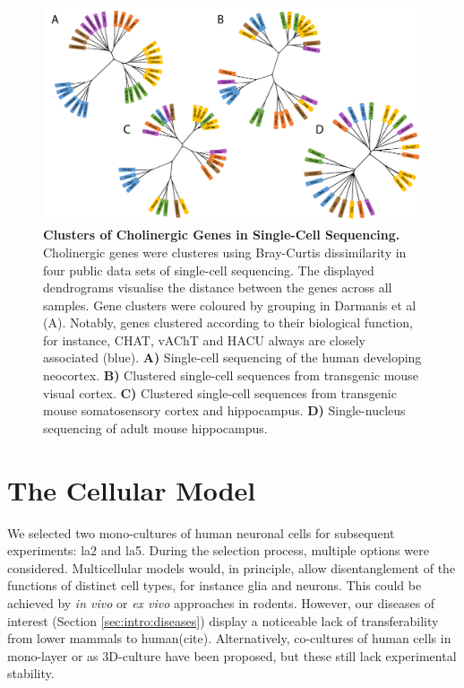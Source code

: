 \begin{figure}
\centering
\includegraphics[width=\textwidth]{figures/chol-clusters}
\caption[Clusters of Cholinergic Genes in Single-Cell Sequencing.]{\textbf{Clusters of Cholinergic Genes in Single-Cell Sequencing.} Cholinergic genes were clusteres using Bray-Curtis dissimilarity in four public data sets of single-cell sequencing. The displayed dendrograms visualise the distance between the genes across all samples. Gene clusters were coloured by grouping in Darmanis et al\cite{Darmanis2015} (A). Notably, genes clustered according to their biological function, for instance, CHAT, vAChT and HACU always are closely associated (blue). \textbf{A)} Single-cell sequencing of the human developing neocortex\cite{Darmanis2015}. \textbf{B)} Clustered single-cell sequences from transgenic mouse visual cortex\cite{Tasic2016}. \textbf{C)} Clustered single-cell sequences from transgenic mouse somatosensory cortex and hippocampus\cite{Zeisel2015}. \textbf{D)} Single-nucleus sequencing of adult mouse hippocampus\cite{Habib2016}. 
\label{fig:chol-clusters}}
\end{figure}

\section{The Cellular Model}
We selected two mono-cultures of human neuronal cells for subsequent experiments: \acs{la2} and \acs{la5}. During the selection process, multiple options were considered. Multicellular models would, in principle, allow disentanglement of the functions of distinct cell types, for instance glia and neurons. This could be achieved by \emph{in vivo} or \emph{ex vivo} approaches in rodents. However, our diseases of interest (Section \ref{sec:intro:diseases}) display a noticeable lack of transferability from lower mammals to human(cite). Alternatively, co-cultures of human cells in mono-layer or as 3D-culture have been proposed, but these still lack experimental stability.

